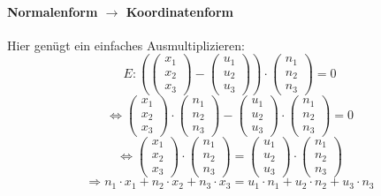 \documentclass[a4paper,10pt,DIV9, BCOR12mm, oneside,openright,openbib]{scrreprt}
\theoremstyle{definition}
\theoremstyle{plain}
\begin{document}
\paragraph{Normalenform $\longrightarrow$ Koordinatenform}
Hier genügt ein einfaches Ausmultiplizieren:
\[E: ( \begin{pmatrix}x_1 \\ x_2 \\ x_3\end{pmatrix}-\begin{pmatrix}u_1 \\ u_2 \\ u_3\end{pmatrix} ) \cdot \begin{pmatrix}n_1 \\ n_2 \\ n_3\end{pmatrix}=0\]
\[\Leftrightarrow \begin{pmatrix}x_1 \\ x_2 \\ x_3\end{pmatrix} \cdot \begin{pmatrix}n_1 \\ n_2 \\ n_3\end{pmatrix} - \begin{pmatrix}u_1 \\ u_2 \\ u_3\end{pmatrix} \cdot \begin{pmatrix}n_1 \\ n_2 \\ n_3\end{pmatrix} = 0\]
\[\Leftrightarrow \begin{pmatrix}x_1 \\ x_2 \\ x_3\end{pmatrix} \cdot \begin{pmatrix}n_1 \\ n_2 \\ n_3\end{pmatrix} = \begin{pmatrix}u_1 \\ u_2 \\ u_3\end{pmatrix} \cdot \begin{pmatrix}n_1 \\ n_2 \\ n_3\end{pmatrix}\]
\[\Rightarrow n_1 \cdot x_1 + n_2 \cdot x_2 + n_3 \cdot x_3 = u_1 \cdot n_1 + u_2 \cdot n_2 + u_3 \cdot n_3\]
\end{document}
